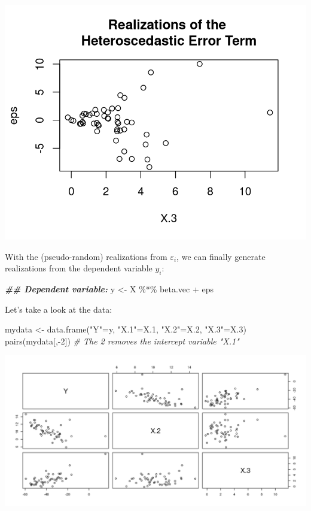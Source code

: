 \documentclass[
  14pt,
]{memoir}
\newenvironment{Shaded}{\begin{snugshade}}{\end{snugshade}}
\newcommand{\CommentTok}[1]{\textcolor[rgb]{0.56,0.35,0.01}{\textit{#1}}}
\newcommand{\DecValTok}[1]{\textcolor[rgb]{0.00,0.00,0.81}{#1}}
\newcommand{\DocumentationTok}[1]{\textcolor[rgb]{0.56,0.35,0.01}{\textbf{\textit{#1}}}}
\newcommand{\FloatTok}[1]{\textcolor[rgb]{0.00,0.00,0.81}{#1}}
\newcommand{\FunctionTok}[1]{\textcolor[rgb]{0.00,0.00,0.00}{#1}}
\newcommand{\NormalTok}[1]{#1}
\newcommand{\OtherTok}[1]{\textcolor[rgb]{0.56,0.35,0.01}{#1}}
\newcommand{\SpecialCharTok}[1]{\textcolor[rgb]{0.00,0.00,0.00}{#1}}
\newcommand{\StringTok}[1]{\textcolor[rgb]{0.31,0.60,0.02}{#1}}
\begin{document}
\begin{center}\includegraphics[width=0.8\linewidth]{figure/minimal-unnamed-chunk-29-1} \end{center}

With the (pseudo-random) realizations from \(\varepsilon_i\), we can finally generate realizations from the dependent variable \(y_i\):

\begin{Shaded}
\begin{Highlighting}[]
\DocumentationTok{\#\# Dependent variable:}
\NormalTok{y   }\OtherTok{\textless{}{-}}\NormalTok{ X }\SpecialCharTok{\%*\%}\NormalTok{ beta.vec }\SpecialCharTok{+}\NormalTok{ eps}
\end{Highlighting}
\end{Shaded}

Let's take a look at the data:

\begin{Shaded}
\begin{Highlighting}[]
\NormalTok{mydata    }\OtherTok{\textless{}{-}} \FunctionTok{data.frame}\NormalTok{(}\StringTok{"Y"}\OtherTok{=}\NormalTok{y, }\StringTok{"X.1"}\OtherTok{=}\NormalTok{X}\FloatTok{.1}\NormalTok{, }\StringTok{"X.2"}\OtherTok{=}\NormalTok{X}\FloatTok{.2}\NormalTok{, }\StringTok{"X.3"}\OtherTok{=}\NormalTok{X}\FloatTok{.3}\NormalTok{)}
\FunctionTok{pairs}\NormalTok{(mydata[,}\SpecialCharTok{{-}}\DecValTok{2}\NormalTok{]) }\CommentTok{\# The \textquotesingle{}{-}2\textquotesingle{} removes the intercept variable "X.1"}
\end{Highlighting}
\end{Shaded}

\begin{center}\includegraphics[width=\textwidth]{figure/minimal-unnamed-chunk-31-1} \end{center}
\end{document}
